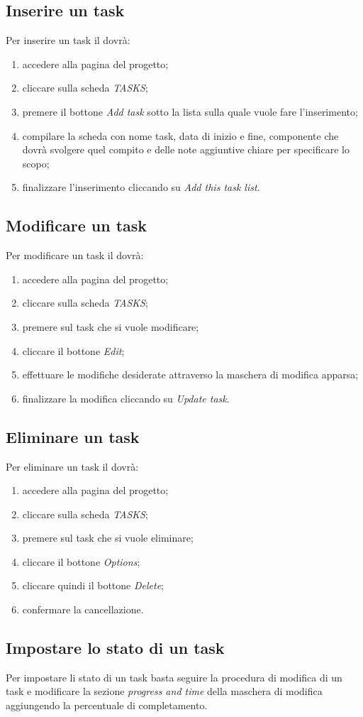 		\subsection{Inserire un task}
			Per inserire un task il  dovrà:
			\begin{enumerate}
				\item accedere alla pagina del progetto;
				\item cliccare sulla scheda \textit{TASKS};
				\item premere il bottone \textit{Add task} sotto la lista sulla quale vuole fare l'inserimento;
				\item compilare la scheda con nome task, data di inizio e fine, componente che dovrà svolgere quel compito e delle note aggiuntive chiare per specificare lo scopo;
				\item finalizzare l'inserimento cliccando su \textit{Add this task list}.
			\end{enumerate}
			
		\subsection{Modificare un task}
			Per modificare un task il  dovrà:
			\begin{enumerate}
				\item accedere alla pagina del progetto;
				\item cliccare sulla scheda \textit{TASKS};
				\item premere sul task che si vuole modificare;
				\item cliccare il bottone \textit{Edit};
				\item effettuare le modifiche desiderate attraverso la maschera di modifica apparsa;
				\item finalizzare la modifica cliccando su \textit{Update task}.
			\end{enumerate}
			
		\subsection{Eliminare un task}
			Per eliminare un task il  dovrà:
			\begin{enumerate}
				\item accedere alla pagina del progetto;
				\item cliccare sulla scheda \textit{TASKS};
				\item premere sul task che si vuole eliminare;
				\item cliccare il bottone \textit{Options};
				\item cliccare quindi il bottone \textit{Delete};
				\item confermare la cancellazione.
			\end{enumerate}
			
		\subsection{Impostare lo stato di un task}
			Per impostare li stato di un task basta  seguire la procedura di modifica di un task e modificare la sezione \textit{progress and time} della maschera di modifica aggiungendo la percentuale di completamento.
